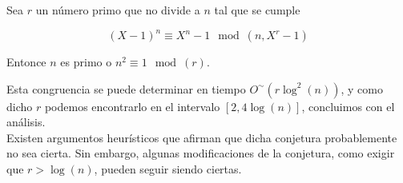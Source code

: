 \begin{conjetura}\label{conjetura_aks}
	Sea $r$ un número primo que no divide a $n$ tal que se cumple
	
	\begin{equation}
	(X - 1)^n \equiv X^n - 1 \mod(n, X^r - 1)
	\end{equation}
	
	Entonce $n$ es primo o $n^2 \equiv 1 \mod(r)$.
\end{conjetura}

Esta congruencia se puede determinar en tiempo $O^\sim(r\log^2(n))$, y como dicho $r$ podemos encontrarlo en el intervalo $[2, 4\log(n)]$, concluimos con el análisis.\\

Existen argumentos heurísticos que afirman que dicha conjetura probablemente no sea cierta. Sin embargo, algunas modificaciones de la conjetura, como exigir que $r > \log(n)$, pueden seguir siendo ciertas.

\endinput
